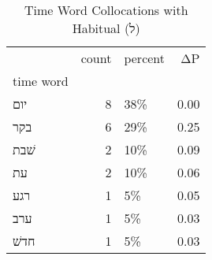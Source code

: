 \begin{table}[htbp!]
\centering
\caption{Time Word Collocations with Habitual (ל)}
\label{table:habל_head_cpd}
\begin{tabular}{lrlr}
\toprule
{} &  count & percent &    ΔP \\
time word &        &         &       \\
\midrule
יום       &      8 &     38\% &  0.00 \\
בקר       &      6 &     29\% &  0.25 \\
שׁבת      &      2 &     10\% &  0.09 \\
עת        &      2 &     10\% &  0.06 \\
רגע       &      1 &      5\% &  0.05 \\
ערב       &      1 &      5\% &  0.03 \\
חדשׁ      &      1 &      5\% &  0.03 \\
\bottomrule
\end{tabular}
\end{table}
